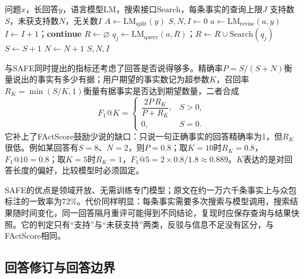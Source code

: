 \begin{algorithm}[SAFE检索增强的逐事实判定]
  \label{alg:nlp-dialogue-safe}
  \begin{algorithmic}[1]
    \Require 问题$x$，长回答$y$，语言模型$\mathrm{LM}$，搜索接口$\mathrm{Search}$，每条事实的查询上限$J$
    \Ensure 支持数$S$，未获支持数$N$，无关数$I$
    \State $A\gets\mathrm{LM}_{\mathrm{split}}(y)$
    \State $S,N,I\gets0$
      \State $a\gets\mathrm{LM}_{\mathrm{revise}}(a,y)$
        \State $I\gets I+1$；\textbf{continue}
      \EndIf
      \State $R\gets\varnothing$
        \State $q_j\gets\mathrm{LM}_{\mathrm{query}}(a,R)$；$R\gets R\cup\mathrm{Search}(q_j)$
      \EndFor
        \State $S\gets S+1$
      \Else
        \State $N\gets N+1$
      \EndIf
    \EndFor
    \State \Return $S,N,I$
  \end{algorithmic}
\end{algorithm}

与SAFE同时提出的指标还考虑了回答是否说得够多。精确率$P=S/(S+N)$衡量说出的事实有多少有据；用户期望的事实数记为超参数$K$，召回率$R_K=\min(S/K,1)$衡量有据事实是否达到期望数量，二者合成
\begin{equation}
 F_1@K=
 \begin{cases}
 \dfrac{2P\,R_K}{P+R_K}, & S>0,\\[1ex]
 0, & S=0.
 \end{cases}
 \label{eq:nlp-dialogue-safe-f1}
\end{equation}
它补上了FActScore鼓励少说的缺口：只说一句正确事实的回答精确率为1，但$R_K$很低。例如某回答有$S=8$、$N=2$，则$P=0.8$；取$K=10$时$R_K=0.8$，$F_1@10=0.8$；取$K=5$时$R_K=1$，$F_1@5=2\times0.8/1.8\approx0.889$。$K$表达的是对回答长度的偏好，比较模型时必须固定。

SAFE的优点是领域开放、无需训练专门模型；原文在约一万六千条事实上与众包标注的一致率为72\%。代价同样明显：每条事实需要多次搜索与模型调用，搜索结果随时间变化，同一回答隔月重评可能得到不同结论，复现时应保存查询与结果快照。它的判定只有“支持”与“未获支持”两类，反驳与信息不足没有区分，与FActScore相同。

\subsection{回答修订与回答边界}
\label{sec:nlp-dialogue-answer-boundary}

